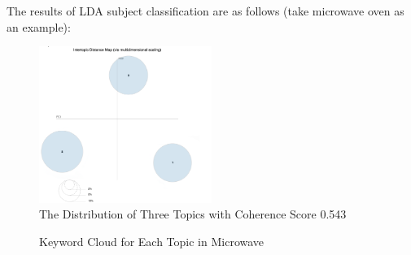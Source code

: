 \documentclass{mcmthesis}
\begin{document}
The results of LDA subject classification are as follows (take microwave oven as an example):\\
\begin{figure}[H] %
	\centering %
	\includegraphics[width=0.5\textwidth]{figures/topic_distribution.png} %
	\caption{The Distribution of Three Topics with Coherence Score 0.543} %
	\label{fig4} %
\end{figure}
\begin{figure}[H]
	\centering  %
	\caption{Keyword Cloud for Each Topic in Microwave }
	\label{Fig.sky2}
\end{figure}
\end{document}
